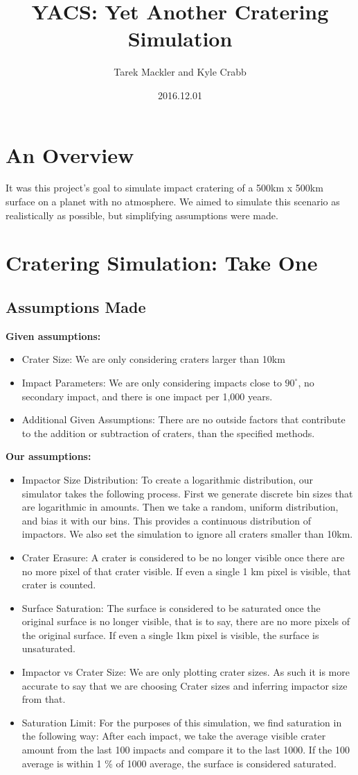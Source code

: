 \documentclass[11pt]{article}
\title{\textbf{YACS: Yet Another Cratering Simulation}}
\author{Tarek Mackler and Kyle Crabb}
\date{2016.12.01}
\begin{document}
\maketitle

\section*{An Overview}
It was this project's goal to simulate impact cratering of a 500km x 500km surface on a planet with no atmosphere. We aimed to simulate this scenario as realistically as possible, but simplifying assumptions were made.
\section{Cratering Simulation: Take One}

\subsection{Assumptions Made}
\textbf{Given assumptions:}
\begin{itemize}
	\item Crater Size: We are only considering craters larger than 10km
	\item Impact Parameters: We are only considering impacts close to \(90 ^{\circ} \), no secondary impact, and there is one impact per 1,000 years.
	\item Additional Given Assumptions: There are no outside factors that contribute to the addition or subtraction of craters, than the specified methods.
\end{itemize}
\textbf{Our assumptions:}
\begin{itemize}
	\item Impactor Size Distribution: To create a logarithmic distribution, our simulator takes the following process. First we generate discrete bin sizes that are logarithmic in amounts. Then we take a random, uniform distribution, and bias it with our bins. This provides a continuous distribution of impactors. We also set the simulation to ignore all craters smaller than 10km. 
	\item Crater Erasure: A crater is considered to be no longer visible once there are no more pixel of that crater visible. If even a single 1 km pixel is visible, that crater is counted.
	\item Surface Saturation: The surface is considered to be saturated once the original surface is no longer visible, that is to say, there are no more pixels of the original surface. If even a single 1km pixel is visible, the surface is unsaturated.
	\item Impactor vs Crater Size: We are only plotting crater sizes. As such it is more accurate to say that we are choosing Crater sizes and inferring impactor size from that.
	\item Saturation Limit: For the purposes of this simulation, we find saturation in the following way: After each impact, we take the average visible crater amount from the last 100 impacts and compare it to the last 1000. If the 100 average is within 1 \% of 1000 average, the surface is considered saturated.  
\end{itemize}
\end{document}
